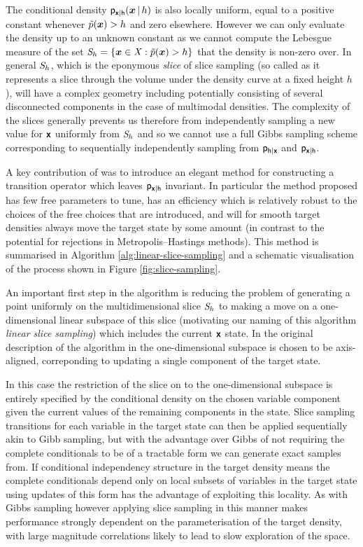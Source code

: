 The conditional density $\mathsf{p}_{\boldsymbol{\mathsf{x}}|\mathsf{h}}(\boldsymbol{x}\operatorname{|} h)$ is also locally uniform, equal to a positive constant whenever $\tilde{p}(\boldsymbol{x}) > h$ and zero elsewhere. However we can only evaluate the density up to an unknown constant as we cannot compute the Lebesgue measure of the set $\set{S}_h = \fset{\vct{x} \in \set{X} : \utgtdens(\vct{x}) > h}$ that the density is non-zero over. In general $\mathit{S}_h$, which is the eponymous \emph{slice} of slice sampling (so called as it represents a slice through the volume under the density curve at a fixed height $h$), will have a complex geometry including potentially consisting of several disconnected components in the case of multimodal densities. The complexity of the slices generally prevents us therefore from independently sampling a new value for $\boldsymbol{\mathsf{x}}$ uniformly from $\mathit{S}_h$ and so we cannot use a full Gibbs sampling scheme corresponding to sequentially independently sampling from $\mathsf{p}_{\mathsf{h}|\boldsymbol{\mathsf{x}}}$ and $\mathsf{p}_{\boldsymbol{\mathsf{x}}|\mathsf{h}}$.

A key contribution of \citep{neal2003slice} was to introduce an elegant method for constructing a transition operator which leaves $\mathsf{p}_{\boldsymbol{\mathsf{x}}|\mathsf{h}}$ invariant. In particular the method proposed has few free parameters to tune, has an efficiency which is relatively robust to the choices of the free choices that are introduced, and will for smooth target densities always move the target state by some amount (in contrast to the potential for rejections in Metropolis--Hastings methods). This method is summarised in Algorithm \ref{alg:linear-slice-sampling} and a schematic visualisation of the process shown in Figure \ref{fig:slice-sampling}.

An important first step in the algorithm is reducing the problem of generating a point uniformly on the multidimensional slice $\mathit{S}_h$ to making a move on a one-dimensional linear subspace of this slice  (motivating our naming of this algorithm \emph{linear slice sampling}) which includes the current $\boldsymbol{\mathsf{x}}$ state. In the original description of the algorithm in \citep{neal2003slice} the one-dimensional subspace is chosen to be axis-aligned, correponding to updating a single component of the target state. 

In this case the restriction of the slice on to the one-dimensional subspace is entirely specified by the conditional density on the chosen variable component given the current values of the remaining components in the state. Slice sampling transitions for each variable in the target state can then be applied sequentially akin to Gibb sampling, but with the advantage over Gibbs of not requiring the complete conditionals to be of a tractable form we can generate exact samples from. If conditional independency structure in the target density means the complete conditionals depend only on local subsets of variables in the target state using updates of this form has the advantage of exploiting this locality. As with Gibbs sampling however applying slice sampling in this manner makes performance strongly dependent on the parameterisation of the target density, with large magnitude correlations likely to lead to slow exploration of the space. 

